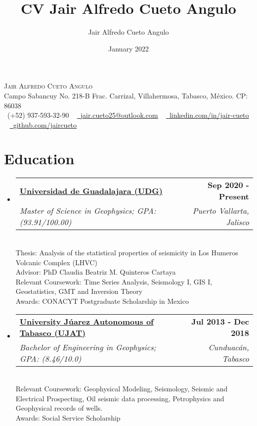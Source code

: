 \documentclass[letterpaper,11pt]{article}
\title{CV Jair Alfredo Cueto Angulo}
\author{Jair Alfredo Cueto Angulo}
\date{January 2022}
\makeatletter
\newcommand{\resumeSubheading}[4]{
  \vspace{-2pt}\item
    \begin{tabular*}{1.0\textwidth}[t]{l@{\extracolsep{\fill}}r}
      \textbf{#1} & \textbf{\small #2} \\
      \textit{\small#3} & \textit{\small #4} \\
    \end{tabular*}\vspace{-7pt}
}
\newcommand{\resumeSubHeadingListStart}{\begin{itemize}[leftmargin=0.0in, label={}]}
\newcommand{\resumeSubHeadingListEnd}{\end{itemize}}
\makeatother
\begin{document}

\begin{center}
    {\Huge \scshape Jair Alfredo Cueto Angulo} \\ \vspace{1pt}
    Campo Sabancuy No. 218-B Frac. Carrizal, Villahermosa, Tabasco, México. CP: 86038 \\ \vspace{1pt}
    \small \raisebox{-0.1\height}\faPhone\  (+52) 937-593-32-90 ~ \href{mailto:x@gmail.com}{\raisebox{-0.2\height}\faEnvelope\  \underline{jair.cueto25@outlook.com}} ~ 
    \href{https://linkedin.com/in//}{\raisebox{-0.2\height}\faLinkedin\ \underline{linkedin.com/in/jair-cueto}}  ~
    \href{https://github.com/}{\raisebox{-0.2\height}\faGithub\ \underline{github.com/jaircueto}}
    \vspace{-8pt}
\end{center}

\section{Education}
  \resumeSubHeadingListStart
    \resumeSubheading
      {\href{https://www.udg.mx/}{Universidad de Guadalajara (UDG)}
}{Sep 2020 - Present}
      {Master of Science in Geophysics;  GPA: (93.91/100.00)}{Puerto Vallarta, Jalisco}
      \\ \vspace{7.5pt}
      {Thesis: Analysis of the statistical properties of seismicity in Los Humeros Volcanic Complex (LHVC)} \\
      {Advisor: PhD Claudia Beatriz M. Quinteros Cartaya}  \\ 
      {Relevant Coursework: Time Series Analysis, Seismology I, GIS I, Geostatistics, GMT and Inversion Theory} \\
      {Awards: CONACYT Postgraduate Scholarship in Mexico}
    \resumeSubheading
      {\href{https://www.ujat.mx//}{University Júarez Autonomous of Tabasco (UJAT)}}{Jul 2013 - Dec 2018}
      {Bachelor of Engineering in Geophysics;  GPA: (8.46/10.0)}{Cunduacán, Tabasco}
      \\ \vspace{7.5pt}
      {Relevant Coursework: Geophysical Modeling, Seismology, Seismic and Electrical Prospecting, Oil seismic data processing, Petrophysics and Geophysical records of wells.} \\
      {Awards: Social Service Scholarship} 
  \resumeSubHeadingListEnd
\end{document}
